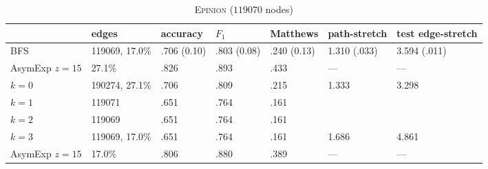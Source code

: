 \documentclass[a4paper,final,notitlepage,11pt,svgnames]{scrartcl}
\begin{document}
\begin{table}[htpb]
	\centering
	\caption{\textsc{Epinion} ($119070$ nodes) \label{tab:epinion}}
	\begin{tabular}{lllllll}
		\toprule
						& edges          & accuracy    & $F_1$       & Matthews    & path-stretch & test edge-stretch \\
		 \midrule
		 BFS            & 119069, 17.0\% & .706 (0.10) & .803 (0.08) & .240 (0.13) & 1.310 (.033) & 3.594 (.011)\\
		 AsymExp $z=15$ & 27.1\%         & .826        & .893        & .433        & ---          & --- \\
		 $k=0$          & 190274, 27.1\% & .706        & .809        & .215        & 1.333        & 3.298\\
		 $k=1$          & 119071         & .651        & .764        & .161        &              & \\
		 $k=2$          & 119069         & .651        & .764        & .161        &              & \\
		 $k=3$          & 119069, 17.0\% & .651        & .764        & .161        & 1.686        & 4.861\\
		 AsymExp $z=15$ & 17.0\%         & .806        & .880        & .389        & ---          & --- \\
		\bottomrule
	\end{tabular}
\end{table}
\end{document}
